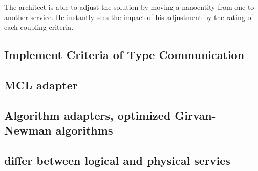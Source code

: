 The architect is able to adjust the solution by moving a nanoentity from one to another service. He instantly sees the impact of his adjustment by the rating of each coupling criteria.

\subsection{Implement Criteria of Type Communication}

\subsection{MCL adapter}
\label{subsec:mclAdapter}

\subsection{Algorithm adapters, optimized Girvan-Newman algorithms}

\subsection{differ between logical and physical servies}